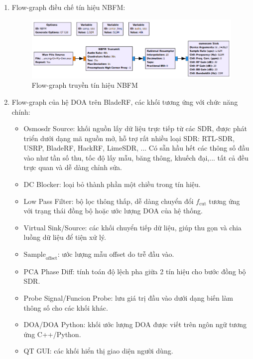 \begin{enumerate}[A$).$]
	\item {
		Flow-graph điều chế tín hiệu NBFM:
		\renewcommand{\thefigure}{C.\arabic{figure}} 
		\setcounter{figure}{0}
\begin{figure} [!h]
	\centering
	\includegraphics[width=1\linewidth]{figures/NBFM.png}
	\caption{Flow-graph truyền tín hiệu NBFM}
	\label{fig:NBFM}
\end{figure}
	\newpage	
}
	
	\item {
		Flow-graph của hệ DOA trên BladeRF, các khối tương ứng với chức năng chính:
		\begin{itemize}
			\item Osmosdr Source: khối nguồn lấy dữ liệu trực tiếp từ các SDR, được phát triển dưới dạng mã nguồn mở,  hỗ trợ rất nhiều loại SDR: RTL-SDR, USRP, BladeRF, HackRF, LimeSDR, ... Có sẵn hầu hết các thông số đầu vào như tần số thu, tốc độ lấy mẫu, băng thông, khuếch đại,... tất cả đều trực quan và dễ dàng chỉnh sửa. %
			\item DC Blocker: loại bỏ thành phần một chiều trong tín hiệu.
			\item Low Pass Filter: bộ lọc thông thấp, dễ dàng chuyển đổi $f_\textrm{cut}$ tương ứng với trạng thái đồng bộ hoặc ước lượng DOA của hệ thống.
			\item Virtual Sink/Source: các khối chuyển tiếp dữ liệu, giúp thu gọn và chia luồng dữ liệu để tiện xử lý.
			\item $\textrm{Sample}_\textrm{offset}$: ước lượng mẫu offset do trễ đầu vào.
			\item PCA Phase Diff: tính toán độ lệch pha giữa 2 tín hiệu cho bước đồng bộ SDR.
			\item Probe Signal/Funcion Probe: lưu giá trị đầu vào dưới dạng biến làm thông số cho các khối khác.
			\item DOA/DOA Python: khối ước lượng DOA được viết trên ngôn ngữ tương ứng C++/Python.
			\item QT GUI: các khối hiển thị giao diện người dùng.
		\end{itemize}
		
}
\end{enumerate}
